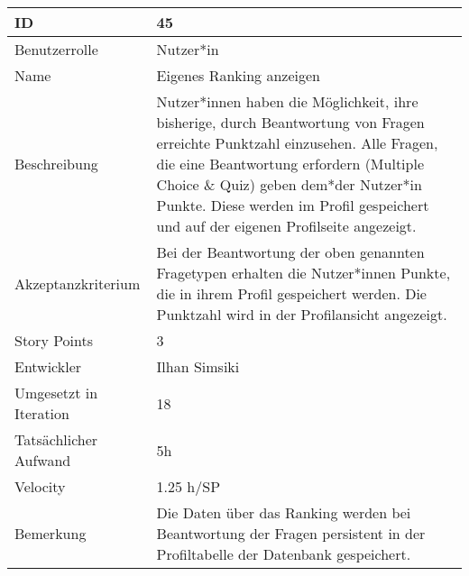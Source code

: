 \begin{tabularx}{\textwidth}{|p{}|X|}
	\hline
	ID & 45\\
	\hline
	Benutzerrolle & Nutzer*in\\
	\hline
	Name & Eigenes Ranking anzeigen\\
	\hline
	Beschreibung & Nutzer*innen haben die Möglichkeit, ihre bisherige, durch Beantwortung von Fragen erreichte Punktzahl einzusehen. Alle Fragen, die eine Beantwortung erfordern (Multiple Choice \& Quiz) geben dem*der Nutzer*in Punkte. Diese werden im Profil gespeichert und auf der eigenen Profilseite angezeigt.\\
	\hline
	Akzeptanzkriterium & Bei der Beantwortung der oben genannten Fragetypen erhalten die Nutzer*innen Punkte, die in ihrem Profil gespeichert werden. Die Punktzahl wird in der Profilansicht angezeigt.\\
	\hline
	Story Points & 3\\
	\hline
	Entwickler & Ilhan Simsiki\\
	\hline
	Umgesetzt in Iteration & 18\\
	\hline
	Tatsächlicher Aufwand & 5h\\
	\hline
	Velocity & 1.25 h/SP \\
	\hline
	Bemerkung & Die Daten über das Ranking werden bei Beantwortung der Fragen persistent in der Profiltabelle der Datenbank gespeichert.\\
	\hline
\end{tabularx}
\vspace{20pt}
